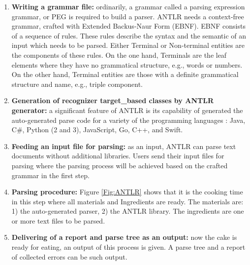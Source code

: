 \begin{enumerate}
		
		\item  {\bf Writing a grammar file:} ordinarily, a grammar called a parsing expression grammar, or PEG is required to build a parser. ANTLR needs a context-free grammar, crafted with Extended Backus-Naur Form (EBNF). EBNF consists of a sequence of rules. These rules describe the syntax and the semantic of an input which needs to be parsed. Either Terminal or Non-terminal entities are the components of these rules. On the one hand, Terminals are the leaf elements where they have no grammatical structure, e.g., words or numbers. On the other hand, Terminal entities are those with a definite grammatical structure and name, e.g., triple component. 
		\item {\bf Generation of recognizer target\_based classes by ANTLR generator:} a significant feature of ANTLR is its capability of generated the auto-generated parse code for  a variety of the programming languages \citealp{ANTLR:Website:Online}: Java, C\#, Python (2 and 3), JavaScript, Go, C++, and Swift.
		\item {\bf Feeding an input file for parsing:} as an input, ANTLR can parse text documents without additional libraries. Users send their input files for parsing where the parsing process will be achieved based on the crafted grammar in the first step.
		\item {\bf Parsing procedure:} {Figure \ref{Fig:ANTLR} } shows that it is the cooking time in this step where all materials and Ingredients are ready. The materials are: 1) the auto-generated parser, 2) the ANTLR library. The ingredients are one or more text files to be parsed. 
		\item {\bf Delivering of a report and parse tree as an output:} now the cake is ready for eating, an output of this process is given. A parse tree and a report of collected errors can be such output.
	\end{enumerate}











